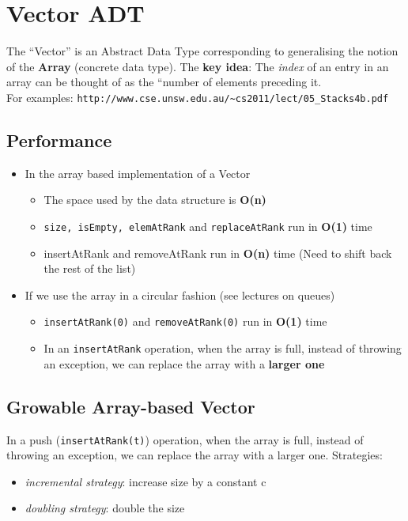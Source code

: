 \documentclass{article}
\begin{document}
\section{Vector ADT}
\begin{flushleft}
The “Vector” is an Abstract Data Type corresponding to generalising the notion of the \textbf{Array} (concrete data type). The \textbf{key idea}: The \textit{index} of an entry in an array can be thought of as the “number of elements preceding it.\\
For examples: \verb!http://www.cse.unsw.edu.au/~cs2011/lect/05_Stacks4b.pdf!
\end{flushleft}

\subsection{Performance}
\begin{itemize}
	\item In the array based implementation of a Vector 
	\begin{itemize}
		\item The space used by the data structure is \textbf{O(n)}
		\item \texttt{size, isEmpty, elemAtRank} and \texttt{replaceAtRank} run in \textbf{O(1)} time
		\item insertAtRank and removeAtRank run in \textbf{O(n)} time (Need to shift back the rest of the list)
	\end{itemize}
	\item If we use the array in a circular fashion (see lectures on queues)
	\begin{itemize}
		\item \texttt{insertAtRank(0)} and \texttt{removeAtRank(0)} run in \textbf{O(1)} time
		\item In an \texttt{insertAtRank} operation, when the array is full, instead of throwing an exception, we can replace the array with a \textbf{larger one}
	\end{itemize}
\end{itemize}

\subsection{Growable Array-based Vector}
\begin{flushleft}
In a push (\texttt{insertAtRank(t)}) operation, when the array is full, instead of throwing an exception, we can replace the array with a larger one. Strategies:
\begin{itemize}
	\item \textit{incremental strategy}: increase size by a constant c
	\item \textit{doubling strategy}: double the size
\end{itemize}
\end{flushleft}
\end{document}
